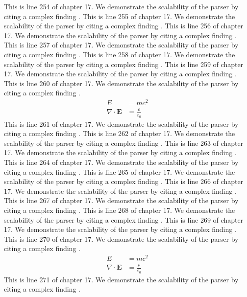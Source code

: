 This is line 254 of chapter 17. We demonstrate the scalability of the parser by citing a complex finding \cite{ref17_254}.
This is line 255 of chapter 17. We demonstrate the scalability of the parser by citing a complex finding \cite{ref17_255}.
This is line 256 of chapter 17. We demonstrate the scalability of the parser by citing a complex finding \cite{ref17_256}.
This is line 257 of chapter 17. We demonstrate the scalability of the parser by citing a complex finding \cite{ref17_257}.
This is line 258 of chapter 17. We demonstrate the scalability of the parser by citing a complex finding \cite{ref17_258}.
This is line 259 of chapter 17. We demonstrate the scalability of the parser by citing a complex finding \cite{ref17_259}.
This is line 260 of chapter 17. We demonstrate the scalability of the parser by citing a complex finding \cite{ref17_260}.
\begin{align*}
  E &= mc^2 \\
  \nabla \cdot \mathbf{E} &= \frac{\rho}{\varepsilon_0}
\end{align*}
This is line 261 of chapter 17. We demonstrate the scalability of the parser by citing a complex finding \cite{ref17_261}.
This is line 262 of chapter 17. We demonstrate the scalability of the parser by citing a complex finding \cite{ref17_262}.
This is line 263 of chapter 17. We demonstrate the scalability of the parser by citing a complex finding \cite{ref17_263}.
This is line 264 of chapter 17. We demonstrate the scalability of the parser by citing a complex finding \cite{ref17_264}.
This is line 265 of chapter 17. We demonstrate the scalability of the parser by citing a complex finding \cite{ref17_265}.
This is line 266 of chapter 17. We demonstrate the scalability of the parser by citing a complex finding \cite{ref17_266}.
This is line 267 of chapter 17. We demonstrate the scalability of the parser by citing a complex finding \cite{ref17_267}.
This is line 268 of chapter 17. We demonstrate the scalability of the parser by citing a complex finding \cite{ref17_268}.
This is line 269 of chapter 17. We demonstrate the scalability of the parser by citing a complex finding \cite{ref17_269}.
This is line 270 of chapter 17. We demonstrate the scalability of the parser by citing a complex finding \cite{ref17_270}.
\begin{align*}
  E &= mc^2 \\
  \nabla \cdot \mathbf{E} &= \frac{\rho}{\varepsilon_0}
\end{align*}
This is line 271 of chapter 17. We demonstrate the scalability of the parser by citing a complex finding \cite{ref17_271}.
